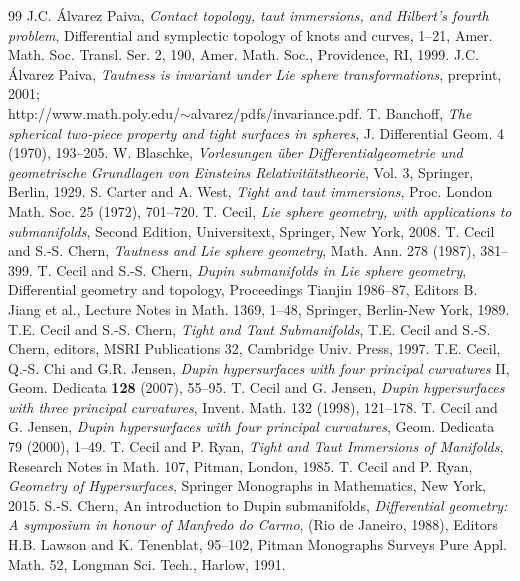 \documentclass[12pt]{article}
\begin{document}
   
\begin{thebibliography}{99}
 J.C. \'{A}lvarez Paiva, {\em Contact topology, taut immersions, and Hilbert's fourth problem}, Differential and symplectic topology of knots and curves, 1--21, Amer. Math. Soc.
Transl. Ser. 2, 190, Amer. Math. Soc., Providence, RI, 1999.
 J.C. \'{A}lvarez Paiva, {\em Tautness is invariant under Lie
sphere transformations}, preprint, 2001;\\
http://www.math.poly.edu/$\sim$alvarez/pdfs/invariance.pdf.
 T. Banchoff, {\em The spherical two-piece property and
tight surfaces in spheres}, J. Differential Geom.  4 (1970), 193--205.
 W. Blaschke, {\em Vorlesungen \"{u}ber Differentialgeometrie und
geometrische Grundlagen von Einsteins Relativit\"{a}tstheorie}, Vol. 3,
Springer, Berlin, 1929.
 S. Carter and A. West, {\em Tight and taut 
immersions}, Proc. London Math. Soc. 25 (1972), 701--720.
 T. Cecil, {\em Lie sphere geometry, with applications to submanifolds}, Second Edition, 
Universitext, Springer, New York, 2008.
 T. Cecil and S.-S. Chern, {\em Tautness and
Lie sphere geometry}, Math. Ann. 278 (1987), 381--399. 
 T. Cecil and S.-S. Chern, {\em Dupin submanifolds in Lie sphere geometry}, Differential geometry and topology, Proceedings Tianjin 1986--87, Editors B. Jiang et al.,
Lecture Notes in Math. 1369, 1--48, Springer, Berlin-New York, 1989.
 T.E. Cecil and S.-S. Chern,
{\em Tight and Taut Submanifolds}, T.E. Cecil and S.-S. Chern, editors,
MSRI Publications 32, Cambridge Univ. Press, 1997.
 T.E. Cecil, Q.-S. Chi and G.R. Jensen, {\em Dupin 
hypersurfaces with four principal curvatures} II,
Geom. Dedicata {\bf 128} (2007), 55--95. 
 T. Cecil and G. Jensen, {\em Dupin hypersurfaces with three principal curvatures}, 
Invent. Math. 132 (1998), 121--178.
 T. Cecil and G. Jensen, {\em Dupin hypersurfaces with four principal curvatures}, 
Geom. Dedicata 79 (2000), 1--49.
 T. Cecil and P. Ryan,
{\em Tight and Taut Immersions of Manifolds}, Research Notes in Math. 107, Pitman,
London, 1985.
 T. Cecil and P. Ryan,
{\em Geometry of Hypersurfaces}, Springer Monographs in Mathematics, New York, 2015.
 S.-S. Chern, An introduction to Dupin submanifolds, {\em Differential geometry: A symposium in
honour of Manfredo do Carmo}, (Rio de Janeiro, 1988), Editors H.B. Lawson and K. Tenenblat, 95--102, 
Pitman Monographs Surveys Pure Appl. Math. 52, Longman Sci. Tech., Harlow, 1991.

\end{thebibliography}
\end{document}
